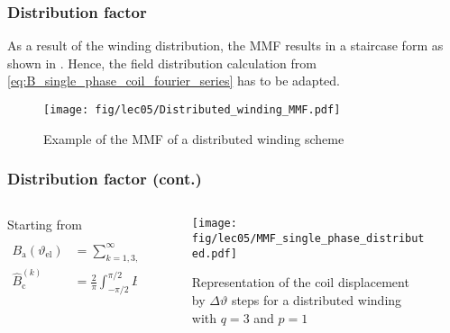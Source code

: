 \begin{frame}
	\frametitle{Distribution factor}
    As a result of the winding distribution, the MMF results in a staircase form as shown in . Hence, the field distribution calculation from \eqref{eq:B_single_phase_coil_fourier_series} has to be adapted. 
    \begin{figure}
        \centering
        \texttt{[image: fig/lec05/Distributed\_winding\_MMF.pdf]}
        \caption{Example of the MMF of a distributed winding scheme}
        \label{fig:Distributed_winding_MMF}
    \end{figure}
\end{frame}

\begin{frame}
	\frametitle{Distribution factor  (cont.)}
    \begin{columns}
		\begin{column}{0.6\textwidth}
	        Starting from
            \begin{align*}
                B_\mathrm{a}(\vartheta_\mathrm{el}) &= \sum_{k=1,3,5,\ldots}^{\infty} \hat{B}_{\mathrm{c}}^{(k)} \cos(k \vartheta_\mathrm{el})\\ \hat{B}_{\mathrm{c}}^{(k)} &= \frac{2}{\pi} \int_{-\pi/2}^{\pi/2} B(\vartheta_\mathrm{el}) \cos(k \vartheta_\mathrm{el}) \mathrm{d}\vartheta_\mathrm{el}
            \end{align*}
        \end{column}
        \begin{column}{0.4\textwidth}
            \begin{figure}
                \centering
                \texttt{[image: fig/lec05/MMF\_single\_phase\_distributed.pdf]}
                \caption{Representation of the coil displacement by $\Delta \vartheta$ steps for a distributed winding with $q=3$ and $p=1$}
                \label{fig:MMF_single_phase_distributed}
            \end{figure}
        \end{column}
    \end{columns}
\end{frame}

